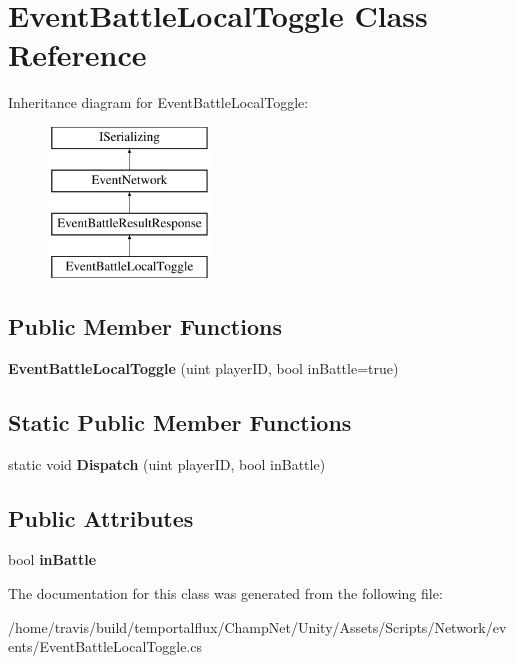\hypertarget{class_event_battle_local_toggle}{\section{Event\-Battle\-Local\-Toggle Class Reference}
\label{class_event_battle_local_toggle}
}
Inheritance diagram for Event\-Battle\-Local\-Toggle\-:\begin{figure}[H]
\begin{center}
\leavevmode
\includegraphics[height=4.000000cm]{class_event_battle_local_toggle}
\end{center}
\end{figure}
\subsection*{Public Member Functions}
\begin{DoxyCompactItemize}
\item 
\hypertarget{class_event_battle_local_toggle_a02484b4c151f7fd5bdd372b45415b456}{{\bfseries Event\-Battle\-Local\-Toggle} (uint player\-I\-D, bool in\-Battle=true)}\label{class_event_battle_local_toggle_a02484b4c151f7fd5bdd372b45415b456}

\end{DoxyCompactItemize}
\subsection*{Static Public Member Functions}
\begin{DoxyCompactItemize}
\item 
\hypertarget{class_event_battle_local_toggle_a83367851b2761eacff1b7281e9a1910a}{static void {\bfseries Dispatch} (uint player\-I\-D, bool in\-Battle)}\label{class_event_battle_local_toggle_a83367851b2761eacff1b7281e9a1910a}

\end{DoxyCompactItemize}
\subsection*{Public Attributes}
\begin{DoxyCompactItemize}
\item 
\hypertarget{class_event_battle_local_toggle_a6be38bd9ff81dd53205b79d50076add4}{bool {\bfseries in\-Battle}}\label{class_event_battle_local_toggle_a6be38bd9ff81dd53205b79d50076add4}

\end{DoxyCompactItemize}


The documentation for this class was generated from the following file\-:\begin{DoxyCompactItemize}
\item 
/home/travis/build/temportalflux/\-Champ\-Net/\-Unity/\-Assets/\-Scripts/\-Network/events/Event\-Battle\-Local\-Toggle.\-cs\end{DoxyCompactItemize}
